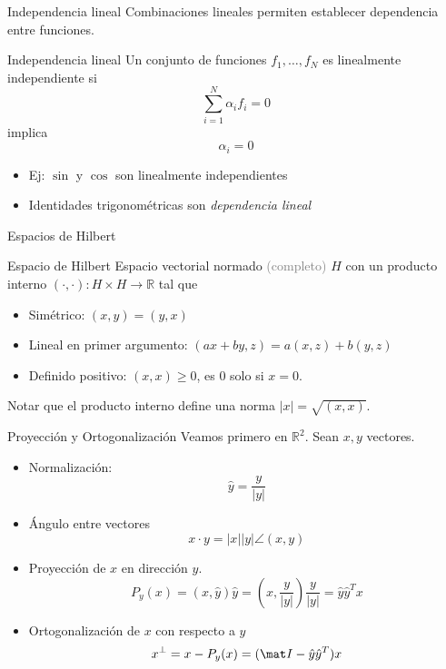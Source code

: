 \documentclass[12pt,aspectratio=169,xcolor=dvipsnames]{beamer}
\newcommand{\R}{\mathbb{R}}
\begin{document}
\begin{frame}{Independencia lineal}
    Combinaciones lineales permiten establecer dependencia entre funciones.
    \begin{block}{Independencia lineal}
        Un conjunto de funciones $f_1, \hdots, f_N$ es linealmente independiente si
          $$\sum_{i=1}^N \alpha_i f_i = 0 $$
          implica
          $$ \alpha_i = 0$$
    \end{block}
    \begin{itemize}
        \item<+-> Ej: $\sin$  y $\cos$ son linealmente independientes
        \item<+-> Identidades trigonométricas son \emph{dependencia lineal}
    \end{itemize}
\end{frame}
\begin{frame}{Espacios de Hilbert}
    \begin{block}{Espacio de Hilbert}
        Espacio vectorial normado \textcolor{gray}{(completo)} $H$ con un producto interno $(\cdot,\cdot):H\times H\to \R$ tal que
        \begin{itemize}
            \item Simétrico: $(x,y) = (y,x)$
            \item Lineal en primer argumento: $(ax + by, z) = a(x,z) + b(y,z)$
            \item Definido positivo: $(x,x)\geq 0$, es 0 solo si $x=0$. 
        \end{itemize}
        Notar que el producto interno define una norma $|x| = \sqrt{(x,x)}$. 
    \end{block}
\end{frame}
\begin{frame}{Proyección y Ortogonalización}
    Veamos primero en $\R^2$. Sean $x,y$ vectores. 
    \begin{itemize}
        \item Normalización:
            $$ \hat y = \frac{y}{|y|} $$
        \item Ángulo entre vectores
            $$ x\cdot y = |x||y|\angle(x,y) $$
        \item Proyección de $x$ en dirección $y$.
            $$P_y(x) = (x, \hat y)\hat y = \left(x, \frac{y}{|y|}\right)\frac{y}{|y|} = \hat y\hat y^T x $$
        \item Ortogonalización de $x$ con respecto a $y$
            $$ x^\perp = x - P_y(x) = (\mat I - \hat y \hat y^T) x $$
    \end{itemize}
\end{frame}
\end{document}
